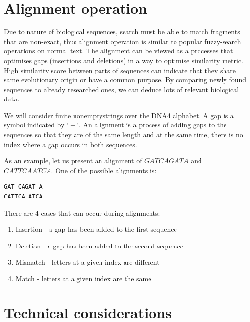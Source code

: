 \section{Alignment operation}

Due to nature of biological sequences, search must be able to match fragments that are non-exact, thus alignment operation is similar to popular fuzzy-search operations on normal text.
The alignment can be viewed as a processes that optimises gaps (insertions and deletions) in a way to optimise similarity metric. High similarity score between parts of sequences can indicate that they share same evolutionary origin or have a common purpose. By comparing newly found sequences to already researched ones, we can deduce lots of relevant biological data. \cite{zpp_bio}

We will consider finite nonemptystrings over the DNA4 alphabet. A gap is a symbol indicated by $‘-’$. An alignment is a process of adding gaps to the sequences so that they are of the same length and at the same time, there is no index where a gap occurs in both sequences.

As an example, let us present an alignment of $GATCAGATA$ and $CATTCAATCA$.
One of the possible alignments is:
\begin{verbatim}
GAT-CAGAT-A
CATTCA-ATCA
\end{verbatim}

\noindent There are 4 cases that can occur during alignments:
\begin{enumerate}
\item Insertion - a gap has been added to the first sequence
\item Deletion - a gap has been added to the second sequence
\item Mismatch - letters at a given index are different
\item Match - letters at a given index are the same
\end{enumerate}


\section{Technical considerations}

